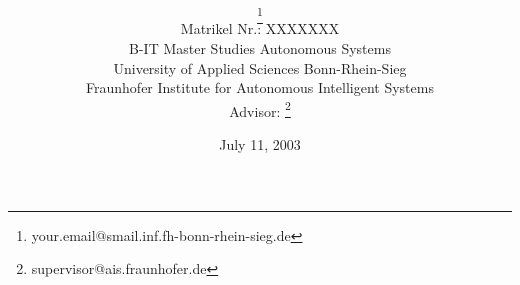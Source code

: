 \title{\PaperTitle\\\PaperSubject}
\author{\href{\PaperMainWriterEMail}{\PaperMainWriter \footnote{\href{\PaperMainWriterEMail} {your.email@smail.inf.fh-bonn-rhein-sieg.de}} 
}\\%
Matrikel Nr.: XXXXXXX \vspace{0.5cm} \\ 
B-IT Master Studies Autonomous Systems \vspace{0.5cm} \\ 
University of Applied Sciences Bonn-Rhein-Sieg\\ %
Fraunhofer Institute for Autonomous Intelligent Systems \vspace{0.7cm} \\ \setcounter{footnote}{6}
Advisor: \href{\PaperLecturerEMail}{\PaperLecturer \footnote{\href{\PaperLecturerEMail} {supervisor@ais.fraunhofer.de}}} \\ 
}%
\date{July 11, 2003}
\maketitle
